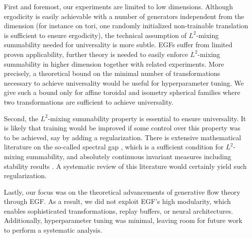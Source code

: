\documentclass{article}
\theoremstyle{plain}
\theoremstyle{definition}
\theoremstyle{remark}
\theoremstyle{fact}
\begin{document}
First and foremost, our experiments are limited to low dimensions. Although ergodicity is easily achievable with a number of generators independent from the dimension (for instance on tori, one randomly initialized non-trainable translation is sufficient to ensure ergodicity), the technical assumption of $L^2$-mixing summability needed for universality is more subtle. 
EGFs suffer from limited proven applicability, further theory is needed to easily enforce $L^2$-mixing summability in higher dimension together with related experiments. More precisely, a theoretical bound on the minimal number of transformations necessary to achieve universality would be useful for hyperparameter tuning. We give such a bound only for affine toroidal and isometry spherical families where two transformations are sufficient to achieve universality.


Second, the $L^2$-mixing summability property is essential to ensure universality. It is likely that training would be improved if some control over this property was to be achieved, say by adding a regularization. There is extensive mathematical literature on the so-called spectral gap \cite{kontoyiannis2012geometric,guivarc2016spectral,marrakchi2018strongly,bekka2020spectral}, which is a sufficient condition for $L^2$-mixing summability, and absolutely continuous invariant measures \cite{gora2003absolutely,bahsoun2004absolutely,galatolo2015statistical} including stability results \cite{froyland2014stability}. A systematic review of this literature would certainly yield such regularization.

Lastly, our focus was on the theoretical advancements of generative flow theory through EGF. As a result, we did not exploit EGF's high modularity, which enables sophisticated transformations, replay buffers, or neural architectures. Additionally, hyperparameter tuning was minimal, leaving room for future work to perform a systematic analysis.
\end{document}
